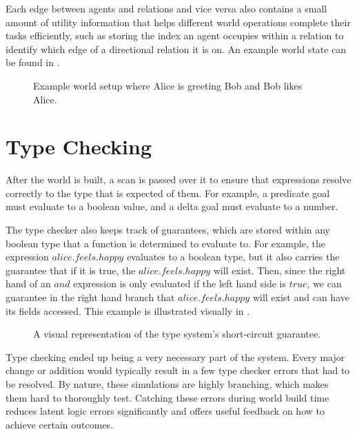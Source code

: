 Each edge between agents and relations and vice versa also contains a small amount of
utility information that helps different world operations complete their tasks
efficiently, such as storing the index an agent occupies within a relation to identify
which edge of a directional relation it is on. An example world state can be found in .

\begin{figure}[h]
    \centering
    \begin{tikzpicture}[scale=1.25]
        
    \end{tikzpicture}
    \caption{Example world setup where Alice is greeting Bob and Bob likes Alice.}
    \label{fig:WorldStateGraph}
\end{figure}

\section{Type Checking} \label{sec:TypeChecking}

After the world is built, a scan is passed over it to ensure that expressions resolve
correctly to the type that is expected of them. For example, a predicate goal must
evaluate to a boolean value, and a delta goal must evaluate to a number.

The type checker also keeps track of guarantees, which are stored within any boolean
type that a function is determined to evaluate to. For example, the expression
$alice.feels.happy$ evaluates to a boolean type, but it also carries the guarantee that
if it is true, the $alice.feels.happy$ will exist. Then, since the right hand of an
$and$ expression is only evaluated if the left hand side is $true$, we can guarantee
in the right hand branch that $alice.feels.happy$ will exist and can have its fields
accessed. This example is illustrated visually in .

\begin{figure}
    \centering
    \begin{tikzpicture}[scale=1.25]
        
    \end{tikzpicture}
    \caption{A visual representation of the type system's short-circuit guarantee.}
    \label{fig:ShortCircuitGuarantee}
\end{figure}

Type checking ended up being a very necessary part of the system. Every major change
or addition would typically result in a few type checker errors that had to be resolved.
By nature, these simulations are highly branching, which makes them hard to thoroughly
test. Catching these errors during world build time reduces latent logic errors
significantly and offers useful feedback on how to achieve certain outcomes.

